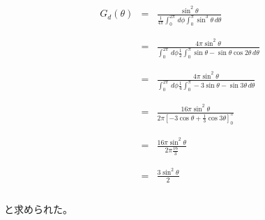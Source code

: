\documentclass[dvipdfmx,autodetect-engine,titlepage]{jsarticle}
\begin{document}
\begin{eqnarray*}
  G_d(\theta) &=& \frac{\sin^2\theta }{\frac{1}{4\pi} \int_{0}^{2\pi} \,d\phi \int_{0}^{\pi} \sin^3\theta \,d\theta  }  \\\\\\
  &=& \frac{4\pi \sin^2\theta }{ \int_{0}^{2\pi} \,d\phi \frac{1}{2} \int_{0}^{\pi}  \sin\theta - \sin\theta\cos2\theta \,d\theta  } \\\\\\
  &=& \frac{4\pi \sin^2\theta }{ \int_{0}^{2\pi} \,d\phi \frac{1}{4} \int_{0}^{\pi}  -3\sin\theta - \sin3\theta\,d\theta  } \\\\\\
  &=& \frac{16\pi \sin^2\theta }{ 2\pi [-3\cos\theta + \frac{1}{3}\cos3\theta]_{0}^{\pi}} \\\\\\
  &=& \frac{16\pi \sin^2\theta }{ 2\pi \frac{16}{3}} \\\\\\
  &=& \frac{3\sin^2\theta}{2}\\\\
\end{eqnarray*}

と求められた。
\end{document}
